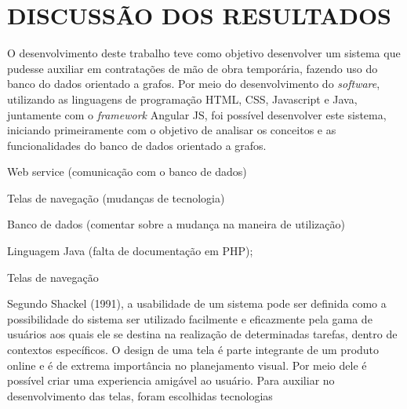 
\chapter{DISCUSSÃO DOS RESULTADOS} 

\par O desenvolvimento deste trabalho teve como objetivo desenvolver um sistema que pudesse auxiliar em contratações de mão de obra temporária, fazendo uso do banco do dados orientado a grafos. Por meio do desenvolvimento do \textit{software}, utilizando as linguagens de programação HTML, CSS, Javascript e Java, juntamente com o \textit{framework} Angular JS, foi possível desenvolver este sistema, iniciando primeiramente com o objetivo de analisar os conceitos e as funcionalidades do banco de dados orientado a grafos.

\par Web service (comunicação com o banco de dados)
\par Telas de navegação (mudanças de tecnologia)
\par Banco de dados (comentar sobre a mudança na maneira de utilização)
\par Linguagem Java (falta de documentação em PHP);


\par Telas de navegação

\par Segundo Shackel (1991), a usabilidade de um sistema pode ser definida como a possibilidade do sistema ser utilizado facilmente e eficazmente pela gama de usuários aos quais ele se destina na realização de determinadas tarefas, dentro de contextos específicos.  O design de uma tela é parte integrante de um produto online e é de extrema importância no planejamento visual. Por meio dele é possível criar uma experiencia amigável ao usuário. Para auxiliar no desenvolvimento das telas, foram escolhidas tecnologias  

